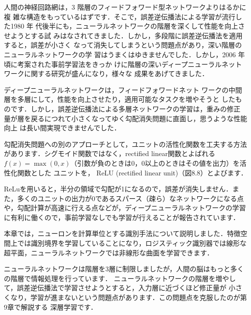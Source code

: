 


人間の神経回路網は，3 階層のフィードフォワード型ネットワークよりはるかに複
雑な構造をもっているはずです．そこで，誤差逆伝播法による学習が流行した1980 年
代後半にも，ニューラルネットワークの階層を深くして性能を向上させようとする試
みはなされてきました．しかし，多段階に誤差逆伝播法を適用すると，誤差が小さく
なって消失してしまうという問題点があり，深い階層のニューラルネットワークの学
習はうまくはゆきませんでした．しかし，2006 年頃に考案された事前学習法をきっか
けに階層の深いディープニューラルネットワークに関する研究が盛んになり，様々な
成果をあげてきました．



ディープニューラルネットワークは，フィードフォワードネット
ワークの中間層を多層にして，性能を向上させたり，適用可能なタスクを増やそうと
したものです．しかし，誤差逆伝播法による多層ネットワークの学習は，重みの修正
量が層を戻るにつれて小さくなってゆく勾配消失問題に直面し，思うような性能向上
は長い間実現できませんでした．


勾配消失問題への別のアプローチとして，ユニットの活性化関数を工夫する方法があります．シグモイド関数ではなく，rectified linear関数とよばれる$f(x)=\max(0,x)$（引数が負のときは0，0以上のときはその値を出力）を活性化関数とした ユニットを，
ReLU
(rectified linear unit)（図8.8）とよびます．


ReLuを用いると，半分の領域で勾配が1になるので，誤差が消失しません．また，多くのユニットの出力が0であるスパース（疎ら）なネットワークになる点や，勾配計算が高速に行える点などが，ディープニューラルネットワークの学習に有利に働くので，事前学習なしでも学習が行えることが報告されています．


本章では，ニューロンを計算単位とする識別手法について説明しました．特徴空間上では識別境界を学習していることになり，ロジスティック識別器では線形な超平面，ニューラルネットワークでは非線形な曲面を学習できます．

ニューラルネットワークは階層を3層に制限しましたが，人間の脳はもっと多くの階層で情報処理を行っています．
ニューラルネットワークの階層を増やして，誤差逆伝播法で学習させようとすると，入力層に近づくほど修正量が
小さくなり，学習が進まないという問題点があります．この問題点を克服したのが第9章で解説する
深層学習です．
